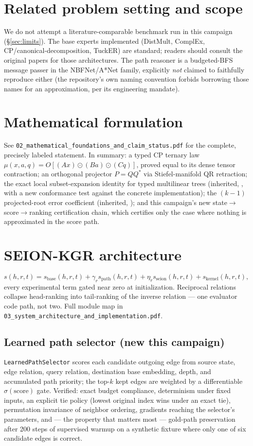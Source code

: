 \documentclass[11pt]{article}
\begin{document}
\section{Related problem setting and scope}
We do not attempt a literature-comparable benchmark run in this campaign (\S\ref{sec:limits}). The
base experts implemented (DistMult, ComplEx, CP/canonical-decomposition, TuckER) are standard;
readers should consult the original papers for those architectures. The path reasoner is a
budgeted-BFS message passer in the NBFNet/A*Net family, explicitly \emph{not} claimed to
faithfully reproduce either (the repository's own naming convention forbids borrowing those names
for an approximation, per its engineering mandate).

\section{Mathematical formulation}
See \texttt{02\_mathematical\_foundations\_and\_claim\_status.pdf} for the complete, precisely
labeled statement. In summary: a typed CP ternary law $\mu(x,a,q)=O[(Ax)\odot(Ba)\odot(Cq)]$,
proved equal to its dense tensor contraction; an orthogonal projector $P=QQ^*$ via Stiefel-manifold
QR retraction; the exact local subset-expansion identity for typed multilinear trees (inherited,
\Proved, with a new conformance test against the concrete implementation); the $(k{-}1)$
projected-root error coefficient (inherited, \ProvedU); and this campaign's new
state$\to$score$\to$ranking certification chain, which certifies only the case where nothing is
approximated in the score path.

\section{SEION-KGR architecture}
\[
  s(h,r,t) = s_{\text{base}}(h,r,t) + \gamma_r s_{\text{path}}(h,r,t) + \eta_r s_{\text{seion}}(h,r,t) + s_{\text{kernel}}(h,r,t),
\]
every experimental term gated near zero at initialization. Reciprocal relations collapse
head-ranking into tail-ranking of the inverse relation --- one evaluator code path, not two. Full
module map in \texttt{03\_system\_architecture\_and\_implementation.pdf}.

\subsection{Learned path selector (new this campaign)}
\texttt{LearnedPathSelector} scores each candidate outgoing edge from source state, edge relation,
query relation, destination base embedding, depth, and accumulated path priority; the top-$k$ kept
edges are weighted by a differentiable $\sigma(\text{score})$ gate. Verified: exact budget
compliance, determinism under fixed inputs, an explicit tie policy (lowest original index wins
under an exact tie), permutation invariance of neighbor ordering, gradients reaching the selector's
parameters, and --- the property that matters most --- gold-path preservation after 200 steps of
supervised warmup on a synthetic fixture where only one of six candidate edges is correct.
\end{document}
